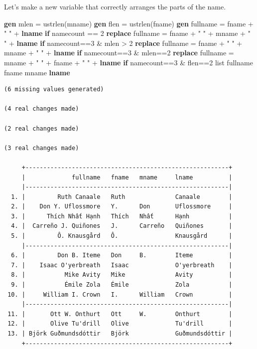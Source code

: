 \documentclass[
]{book}
\newenvironment{Shaded}{\begin{snugshade}}{\end{snugshade}}
\newcommand{\FunctionTok}[1]{\textcolor[rgb]{0.13,0.29,0.53}{\textbf{#1}}}
\newcommand{\KeywordTok}[1]{\textcolor[rgb]{0.13,0.29,0.53}{\textbf{#1}}}
\newcommand{\NormalTok}[1]{#1}
\newcommand{\OtherTok}[1]{\textcolor[rgb]{0.56,0.35,0.01}{#1}}
\newcommand{\StringTok}[1]{\textcolor[rgb]{0.31,0.60,0.02}{#1}}
\begin{document}
Let's make a new variable that correctly arranges the parts of the name.

\begin{Shaded}
\begin{Highlighting}[]
    \KeywordTok{gen}\NormalTok{ mlen = ustrlen(mname)}
    \KeywordTok{gen}\NormalTok{ flen = ustrlen(fname)}
    \KeywordTok{gen}\NormalTok{ fullname = fname + }\StringTok{" "}\NormalTok{ + }\FunctionTok{lname} \KeywordTok{if}\NormalTok{ namecount == 2}
    \KeywordTok{replace}\NormalTok{ fullname = fname + }\StringTok{" "}\NormalTok{ + mname + }\StringTok{" "}\NormalTok{ + }\FunctionTok{lname} \KeywordTok{if}\NormalTok{ namecount==3 \& mlen \textgreater{} 2}
    \KeywordTok{replace}\NormalTok{ fullname = fname + }\StringTok{" "}\NormalTok{ + mname + }\StringTok{" "}\NormalTok{ + }\FunctionTok{lname} \KeywordTok{if}\NormalTok{ namecount==3 \& mlen==2}
    \KeywordTok{replace}\NormalTok{ fullname = mname + }\StringTok{" "}\NormalTok{ + fname + }\StringTok{" "}\NormalTok{ + }\FunctionTok{lname} \KeywordTok{if}\NormalTok{ namecount==3 \& flen==2}
    \OtherTok{list}\NormalTok{ fullname fname mname }\FunctionTok{lname}
\end{Highlighting}
\end{Shaded}

\begin{verbatim}
(6 missing values generated)

(4 real changes made)

(2 real changes made)

(3 real changes made)

     +---------------------------------------------------------+
     |             fullname   fname   mname     lname          |
     |---------------------------------------------------------|
  1. |         Ruth Canaale   Ruth              Canaale        |
  2. |    Don Y. Uflossmore   Y.      Don       Uflossmore     |
  3. |      Thích Nhất Hạnh   Thích   Nhất      Hạnh           |
  4. |  Carreño J. Quiñones   J.      Carreño   Quiñones       |
  5. |         Ô. Knausgård   Ô.                Knausgård      |
     |---------------------------------------------------------|
  6. |         Don B. Iteme   Don     B.        Iteme          |
  7. |    Isaac O'yerbreath   Isaac             O'yerbreath    |
  8. |           Mike Avity   Mike              Avity          |
  9. |           Émile Zola   Émile             Zola           |
 10. |     William I. Crown   I.      William   Crown          |
     |---------------------------------------------------------|
 11. |       Ott W. Onthurt   Ott     W.        Onthurt        |
 12. |       Olive Tu'drill   Olive             Tu'drill       |
 13. | Björk Guðmundsdóttir   Björk             Guðmundsdóttir |
     +---------------------------------------------------------+
\end{verbatim}
\end{document}
